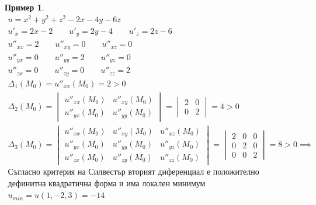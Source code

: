 \documentclass[a4paper,fleqn,12pt]{article}
\theoremstyle{definition}
\newtheorem{example}{Пример}[subsection]
\begin{document}
\begin{example}
\begin{gather*}
u = x^2 + y^2 + z^2 - 2x - 4y - 6z\\
u'_x = 2x - 2 \qquad u'_y = 2y - 4 \qquad u'_z = 2z - 6 \\
u''_{xx} = 2 \qquad u''_{xy} = 0 \qquad u''_{xz} = 0 \\
u''_{yx} = 0 \qquad u''_{yy} = 2 \qquad u''_{yz} = 0 \\
u''_{zx} = 0 \qquad u''_{zy} = 0 \qquad u''_{zz} = 2 \\
\Delta_1 (M_0) = u''_{xx}(M_0) = 2 >0 \\
\Delta_2 (M_0) = 
\begin{vmatrix}
u''_{xx}(M_0) &  u''_{xy}(M_0) \\ 
u''_{yx}(M_0) &  u''_{yy}(M_0) 
\end{vmatrix} = 
\begin{vmatrix}
2 &  0 \\ 
0 &  2
\end{vmatrix} = 4 >0 \\
\Delta_3 (M_0) = 
\begin{vmatrix}
u''_{xx}(M_0) &  u''_{xy}(M_0)  & u''_{xz}(M_0)\\ 
u''_{yx}(M_0) &  u''_{yy}(M_0)  & u''_{yz}(M_0) \\
u''_{zx}(M_0) &  u''_{zy}(M_0)  & u''_{zz}(M_0)
\end{vmatrix} = 
\begin{vmatrix}
2 &  0  & 0\\ 
0 & 2  & 0 \\
0 &  0 & 2
\end{vmatrix} = 8 >0 \implies \\
\text{Съгласно критерия на Силвестър вторият диференциал е положително} \\
\text{дефинитна квадратична форма и има локален минимум} \\
u_{min} = u(1,-2,3) = -14 
\end{gather*}


\end{example}
\end{document}
